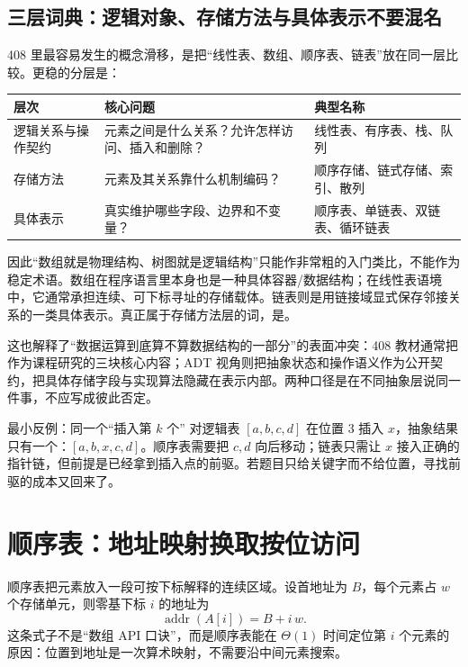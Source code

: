 \documentclass[UTF8,fontset=none,11pt,a4paper]{ctexart}
\begin{document}
\subsection{三层词典：逻辑对象、存储方法与具体表示不要混名}
408 里最容易发生的概念滑移，是把“线性表、数组、顺序表、链表”放在同一层比较。更稳的分层是：
\begin{center}\small
\begin{tabularx}{\linewidth}{L{2.2cm}YY}
\toprule
层次 & 核心问题 & 典型名称\\
\midrule
逻辑关系与操作契约 & 元素之间是什么关系？允许怎样访问、插入和删除？ & 线性表、有序表、栈、队列\\
存储方法 & 元素及其关系靠什么机制编码？ & 顺序存储、链式存储、索引、散列\\
具体表示 & 真实维护哪些字段、边界和不变量？ & 顺序表、单链表、双链表、循环链表\\
\bottomrule
\end{tabularx}\end{center}

因此“数组就是物理结构、树图就是逻辑结构”只能作非常粗的入门类比，不能作为稳定术语。数组在程序语言里本身也是一种具体容器/数据结构；在线性表语境中，它通常承担连续、可下标寻址的存储载体。链表则是用链接域显式保存邻接关系的一类具体表示。真正属于存储方法层的词，是。

这也解释了“数据运算到底算不算数据结构的一部分”的表面冲突：408 教材通常把作为课程研究的三块核心内容；ADT 视角则把抽象状态和操作语义作为公开契约，把具体存储字段与实现算法隐藏在表示内部。两种口径是在不同抽象层说同一件事，不应写成彼此否定。

\begin{examplebox}{最小反例：同一个“插入第 $k$ 个”}
对逻辑表 $[a,b,c,d]$ 在位置 $3$ 插入 $x$，抽象结果只有一个：$[a,b,x,c,d]$。顺序表需要把 $c,d$ 向后移动；链表只需让 $x$ 接入正确的指针链，但前提是已经拿到插入点的前驱。若题目只给关键字而不给位置，寻找前驱的成本又回来了。
\end{examplebox}

\section{顺序表：地址映射换取按位访问}
顺序表把元素放入一段可按下标解释的连续区域。设首地址为 $B$，每个元素占 $w$ 个存储单元，则零基下标 $i$ 的地址为
\[
\operatorname{addr}(A[i])=B+i\,w.
\]
这条式子不是“数组 API 口诀”，而是顺序表能在 $\Theta(1)$ 时间定位第 $i$ 个元素的原因：位置到地址是一次算术映射，不需要沿中间元素搜索。
\end{document}
